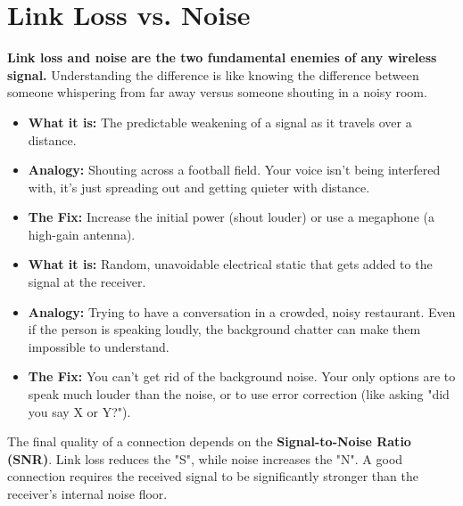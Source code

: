 
\chapter{Link Loss vs. Noise}
\label{ch:loss-vs-noise}

\begin{nontechnical}
    \textbf{Link loss and noise are the two fundamental enemies of any wireless signal.} Understanding the difference is like knowing the difference between someone whispering from far away versus someone shouting in a noisy room.

    \begin{itemize}
        \item \textbf{What it is:} The predictable weakening of a signal as it travels over a distance.
        \item \textbf{Analogy:} Shouting across a football field. Your voice isn't being interfered with, it's just spreading out and getting quieter with distance.
        \item \textbf{The Fix:} Increase the initial power (shout louder) or use a megaphone (a high-gain antenna).
    \end{itemize}

    \begin{itemize}
        \item \textbf{What it is:} Random, unavoidable electrical static that gets added to the signal at the receiver.
        \item \textbf{Analogy:} Trying to have a conversation in a crowded, noisy restaurant. Even if the person is speaking loudly, the background chatter can make them impossible to understand.
        \item \textbf{The Fix:} You can't get rid of the background noise. Your only options are to speak much louder than the noise, or to use error correction (like asking "did you say X or Y?").
    \end{itemize}

     The final quality of a connection depends on the \textbf{Signal-to-Noise Ratio (SNR)}. Link loss reduces the "S", while noise increases the "N". A good connection requires the received signal to be significantly stronger than the receiver's internal noise floor.
\end{nontechnical}


